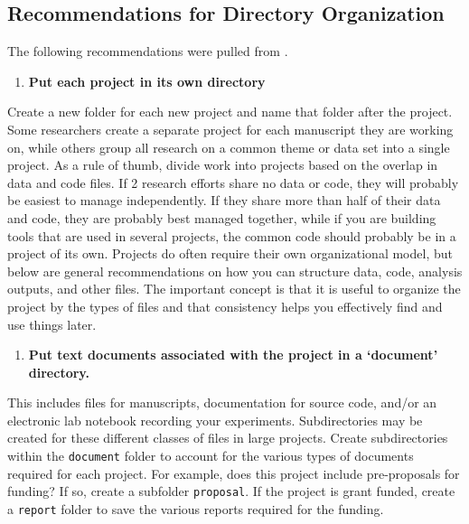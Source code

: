 \documentclass[
]{book}
\providecommand{\tightlist}{%
  \setlength{\itemsep}{0pt}\setlength{\parskip}{0pt}}
\begin{document}
\hypertarget{recommendations-for-directory-organization}{%
\subsection{Recommendations for Directory Organization}\label{recommendations-for-directory-organization}}

The following recommendations were pulled from \citet{Spreckelsen_2020}.

\begin{enumerate}
\def\labelenumi{\arabic{enumi}.}
\tightlist
\item
  \textbf{Put each project in its own directory}
\end{enumerate}

Create a new folder for each new project and name that folder after the project. Some researchers create a separate project for each manuscript they are working on, while others group all research on a common theme or data set into a single project.
As a rule of thumb, divide work into projects based on the overlap in data and code files. If 2 research efforts share no data or code, they will probably be easiest to manage independently. If they share more than half of their data and code, they are probably best managed together, while if you are building tools that are used in several projects, the common code should probably be in a project of its own. Projects do often require their own organizational model, but below are general recommendations on how you can structure data, code, analysis outputs, and other files. The important concept is that it is useful to organize the project by the types of files and that consistency helps you effectively find and use things later.

\begin{enumerate}
\def\labelenumi{\arabic{enumi}.}
\setcounter{enumi}{1}
\tightlist
\item
  \textbf{Put text documents associated with the project in a `document' directory.}
\end{enumerate}

This includes files for manuscripts, documentation for source code, and/or an electronic lab notebook recording your experiments. Subdirectories may be created for these different classes of files in large projects. Create subdirectories within the \texttt{document} folder to account for the various types of documents required for each project. For example, does this project include pre-proposals for funding? If so, create a subfolder \texttt{proposal}. If the project is grant funded, create a \texttt{report} folder to save the various reports required for the funding.
\end{document}

